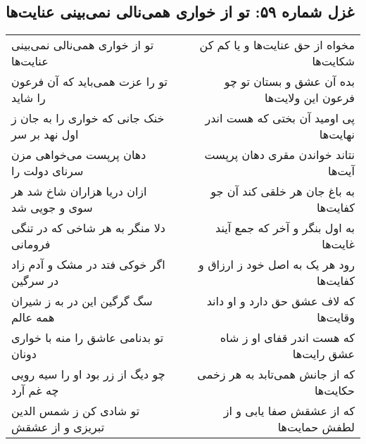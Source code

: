 \begin{center}
\section*{غزل شماره ۵۹: تو از خواری همی‌نالی نمی‌بینی عنایت‌ها}
\label{sec:0059}
\begin{longtable}{l p{0.5cm} r}
تو از خواری همی‌نالی نمی‌بینی عنایت‌ها
&&
مخواه از حق عنایت‌ها و یا کم کن شکایت‌ها
\\
تو را عزت همی‌باید که آن فرعون را شاید
&&
بده آن عشق و بستان تو چو فرعون این ولایت‌ها
\\
خنک جانی که خواری را به جان ز اول نهد بر سر
&&
پی اومید آن بختی که هست اندر نهایت‌ها
\\
دهان پرپست می‌خواهی مزن سرنای دولت را
&&
نتاند خواندن مقری دهان پرپست آیت‌ها
\\
ازان دریا هزاران شاخ شد هر سوی و جویی شد
&&
به باغ جان هر خلقی کند آن جو کفایت‌ها
\\
دلا منگر به هر شاخی که در تنگی فرومانی
&&
به اول بنگر و آخر که جمع آیند غایت‌ها
\\
اگر خوکی فتد در مشک و آدم زاد در سرگین
&&
رود هر یک به اصل خود ز ارزاق و کفایت‌ها
\\
سگ گرگین این در به ز شیران همه عالم
&&
که لاف عشق حق دارد و او داند وقایت‌ها
\\
تو بدنامی عاشق را منه با خواری دونان
&&
که هست اندر قفای او ز شاه عشق رایت‌ها
\\
چو دیگ از زر بود او را سیه رویی چه غم آرد
&&
که از جانش همی‌تابد به هر زخمی حکایت‌ها
\\
تو شادی کن ز شمس الدین تبریزی و از عشقش
&&
که از عشقش صفا یابی و از لطفش حمایت‌ها
\\
\end{longtable}
\end{center}
